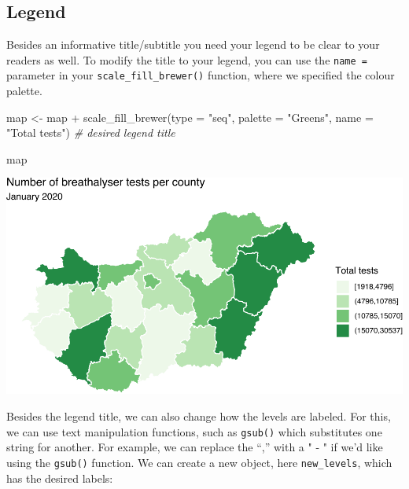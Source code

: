 \documentclass[
  krantz2]{krantz}
\makeatletter
\newenvironment{Shaded}{\begin{snugshade}}{\end{snugshade}}
\newcommand{\AttributeTok}[1]{\textcolor[rgb]{0.61,0.61,0.61}{#1}}
\newcommand{\CommentTok}[1]{\textcolor[rgb]{0.37,0.37,0.37}{\textit{#1}}}
\newcommand{\FunctionTok}[1]{\textcolor[rgb]{0,0,0}{#1}}
\newcommand{\NormalTok}[1]{#1}
\newcommand{\OtherTok}[1]{\textcolor[rgb]{0.37,0.37,0.37}{#1}}
\newcommand{\SpecialCharTok}[1]{\textcolor[rgb]{0,0,0}{#1}}
\newcommand{\StringTok}[1]{\textcolor[rgb]{0.5,0.5,0.5}{#1}}
\newenvironment{kframe}{%
\medskip{}
\setlength{\fboxsep}{.8em}
 \def\at@end@of@kframe{}%
 \ifinner\ifhmode%
  \def\at@end@of@kframe{\end{minipage}}%
  \begin{minipage}{\columnwidth}%
 \fi\fi%
 \def\FrameCommand##1{\hskip\@totalleftmargin \hskip-\fboxsep
 \colorbox{shadecolor}{##1}\hskip-\fboxsep
     \hskip-\linewidth \hskip-\@totalleftmargin \hskip\columnwidth}%
 \MakeFramed {\advance\hsize-\width
   \@totalleftmargin\z@ \linewidth\hsize
   \@setminipage}}%
 {\par\unskip\endMakeFramed%
 \at@end@of@kframe}
\renewenvironment{Shaded}{\begin{kframe}}{\end{kframe}}
\makeatother
\begin{document}
\hypertarget{legend}{%
\subsection{Legend}\label{legend}}

Besides an informative title/subtitle you need your legend to be clear to your readers as well. To modify the title to your legend, you can use the \texttt{name\ =} parameter in your \texttt{scale\_fill\_brewer()} function, where we specified the colour palette.

\begin{Shaded}
\begin{Highlighting}[]
\NormalTok{map }\OtherTok{\textless{}{-}}\NormalTok{ map }\SpecialCharTok{+} 
  \FunctionTok{scale\_fill\_brewer}\NormalTok{(}\AttributeTok{type =} \StringTok{"seq"}\NormalTok{, }\AttributeTok{palette =} \StringTok{"Greens"}\NormalTok{, }
                    \AttributeTok{name =} \StringTok{"Total tests"}\NormalTok{)  }\CommentTok{\# desired legend title}

\NormalTok{map}
\end{Highlighting}
\end{Shaded}

\includegraphics{crime_mapping_files/figure-latex/legend-1.pdf}

Besides the legend title, we can also change how the levels are labeled. For this, we can use text manipulation functions, such as \texttt{gsub()} which substitutes one string for another. For example, we can replace the ``,'' with a " - " if we'd like using the \texttt{gsub()} function. We can create a new object, here \texttt{new\_levels}, which has the desired labels:

\begin{Shaded}
\end{Shaded}
\end{document}
